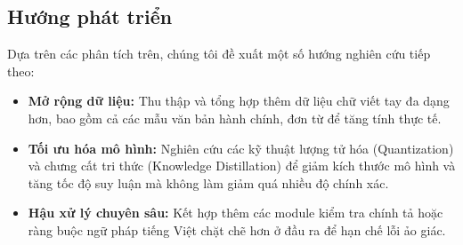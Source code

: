 \subsection{Hướng phát triển}

Dựa trên các phân tích trên, chúng tôi đề xuất một số hướng nghiên cứu tiếp theo:

\begin{itemize}
    \item \textbf{Mở rộng dữ liệu:} Thu thập và tổng hợp thêm dữ liệu chữ viết tay đa dạng hơn, bao gồm cả các mẫu văn bản hành chính, đơn từ để tăng tính thực tế.
    \item \textbf{Tối ưu hóa mô hình:} Nghiên cứu các kỹ thuật lượng tử hóa (Quantization) và chưng cất tri thức (Knowledge Distillation) để giảm kích thước mô hình và tăng tốc độ suy luận mà không làm giảm quá nhiều độ chính xác.
    \item \textbf{Hậu xử lý chuyên sâu:} Kết hợp thêm các module kiểm tra chính tả hoặc ràng buộc ngữ pháp tiếng Việt chặt chẽ hơn ở đầu ra để hạn chế lỗi ảo giác.
\end{itemize}
